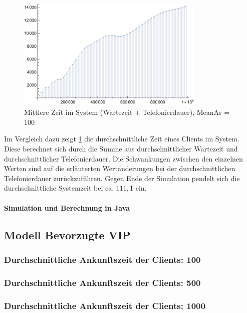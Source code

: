 \begin{figure}[htpb]
	\centering
	\includegraphics[width=0.8\textwidth]{abbildungen/auswertung100/meanSystemTimePlot.pdf}
	\caption{Mittlere Zeit im System (Wartezeit + Telefonierdauer), MeanAr = 100}
	\label{fig:meanSystemTime100}
\end{figure}

Im Vergleich dazu zeigt \ref{fig:meanSystemTime100} die durchschnittliche Zeit eines Clients im System. Diese berechnet sich durch die Summe aus durchschnittlicher Wartezeit und durchschnittlicher Telefonierdauer. Die Schwankungen zwischen den einzelnen Werten sind auf die erläuterten Wertänderungen bei der durchschnittlichen Telefonierdauer zurückzuführen. Gegen Ende der Simulation pendelt sich die durchschnittliche Systemzeit bei ca. $111,1$ ein.
  
\paragraph{Simulation und Berechnung in Java}




\subsection{Modell \glqq Bevorzugte VIP\grqq} 
\subsubsection{Durchschnittliche Ankunftszeit der Clients: 100}
\subsubsection{Durchschnittliche Ankunftszeit der Clients: 500}
\subsubsection{Durchschnittliche Ankunftszeit der Clients: 1000}

